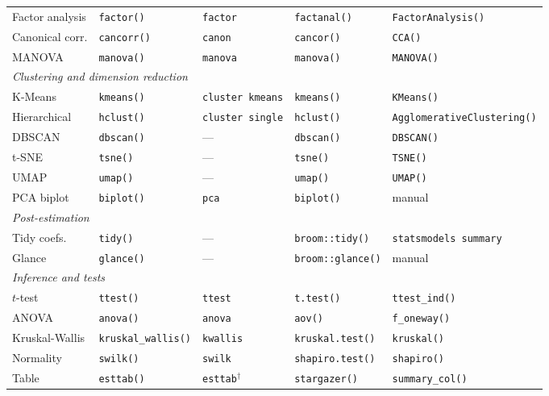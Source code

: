 {\begin{longtable}{lllll}
Factor analysis & \texttt{factor()}     & \texttt{factor}       & \texttt{factanal()}    & \texttt{FactorAnalysis()} \\
Canonical corr. & \texttt{cancorr()}    & \texttt{canon}        & \texttt{cancor()}      & \texttt{CCA()} \\
MANOVA          & \texttt{manova()}     & \texttt{manova}       & \texttt{manova()}      & \texttt{MANOVA()} \\
\midrule
\multicolumn{5}{l}{\textit{Clustering and dimension reduction}} \\
K-Means         & \texttt{kmeans()}     & \texttt{cluster kmeans} & \texttt{kmeans()}    & \texttt{KMeans()} \\
Hierarchical    & \texttt{hclust()}     & \texttt{cluster single} & \texttt{hclust()}    & \texttt{AgglomerativeClustering()} \\
DBSCAN          & \texttt{dbscan()}     & —                     & \texttt{dbscan()}      & \texttt{DBSCAN()} \\
t-SNE           & \texttt{tsne()}       & —                     & \texttt{tsne()}        & \texttt{TSNE()} \\
UMAP            & \texttt{umap()}       & —                     & \texttt{umap()}        & \texttt{UMAP()} \\
PCA biplot      & \texttt{biplot()}     & \texttt{pca}          & \texttt{biplot()}      & manual \\
\midrule
\multicolumn{5}{l}{\textit{Post-estimation}} \\
Tidy coefs.     & \texttt{tidy()}       & —                     & \texttt{broom::tidy()} & \texttt{statsmodels summary} \\
Glance          & \texttt{glance()}     & —                     & \texttt{broom::glance()} & manual \\
\midrule
\multicolumn{5}{l}{\textit{Inference and tests}} \\
$t$-test        & \texttt{ttest()}      & \texttt{ttest}        & \texttt{t.test()}      & \texttt{ttest\_ind()} \\
ANOVA           & \texttt{anova()}      & \texttt{anova}        & \texttt{aov()}         & \texttt{f\_oneway()} \\
Kruskal-Wallis  & \texttt{kruskal\_wallis()} & \texttt{kwallis} & \texttt{kruskal.test()} & \texttt{kruskal()} \\
Normality       & \texttt{swilk()}      & \texttt{swilk}        & \texttt{shapiro.test()} & \texttt{shapiro()} \\
Table           & \texttt{esttab()}     & \texttt{esttab}$^\dagger$ & \texttt{stargazer()} & \texttt{summary\_col()} \\
\end{longtable}}

